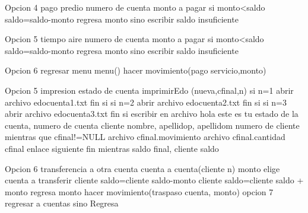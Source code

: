 \documentclass{article}
\begin{document}
\begin{multicols}{2}
                        Opcion 4 pago predio
                            numero de cuenta
                            monto a pagar
                            si monto<saldo
                            saldo=saldo-monto
                            regresa monto 
                            sino 
                            escribir saldo insuficiente
                        
                        Opcion 5 tiempo aire 
                            numero de cuenta
                            monto a pagar
                            si monto<saldo
                            saldo=saldo-monto
                            regresa monto 
                            sino 
                            escribir saldo insuficiente
                        
                        Opcion 6 regresar menu
                            menu()
                        hacer movimiento(pago servicio,monto)
                    
                    Opcion 5 impresion estado de cuenta 
                        imprimirEdo (nueva,cfinal,n)
                            si n=1 
                            abrir archivo edocuenta1.txt
                            fin si 
                            si n=2
                            abrir archivo edocuenta2.txt
                            fin si 
                            si n=3
                            abrir archivo edocuenta3.txt
                            fin si
                            escribir en archivo 
                            hola este es tu estado de la cuenta, numero de cuenta  
                            cliente nombre, apellidop, apellidom 
                            numero de cliente 
                            mientras que cfinal!=NULL 
                                archivo cfinal.movimiento
                                archivo cfinal.cantidad 
                                cfinal enlace siguiente 
                            fin mientras
                            saldo final, cliente saldo 
                    
                    Opcion 6 transferencia a otra cuenta
                    cuenta a cuenta(cliente n) 
                        monto 
                        elige cuenta a transferir 
                        cliente saldo=cliente saldo-monto
                        cliente saldo=cliente saldo + monto
                        regresa monto 
                    hacer movimiento(traspaso cuenta, monto)
                    opcion 7 regresar a cuentas
            sino 
            Regresa
            

\end{multicols}
\end{document}
